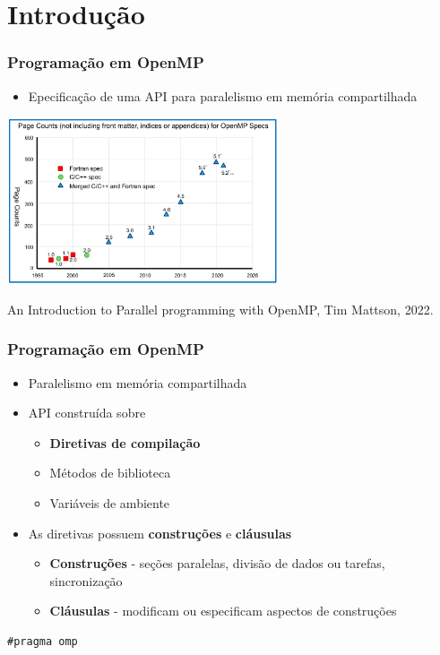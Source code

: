 \documentclass[xcolor={usenames,dvipsnames},12pt,presentation,aspectratio=169]{beamer}
\newcommand{\blue}[1]{{\color{blue}#1}}
\begin{document}
\section{Introdução}
\begin{frame}[fragile]
  \frametitle{Programação em OpenMP}
  \begin{itemize}
  \item Epecificação de uma API para paralelismo em \blue{memória compartilhada}
  \end{itemize}
  \begin{center}
    \includegraphics[width=0.6\textwidth]{timespec.png}
   \end{center}  
  \vspace{-4mm}
  {\tiny An Introduction to Parallel programming with OpenMP, Tim Mattson, 2022.}  
\end{frame}
\begin{frame}[fragile]
  \frametitle{Programação em OpenMP}
  \begin{itemize}
  \item Paralelismo em \blue{memória compartilhada}
  \item API construída sobre
    \begin{itemize}
    \item {\bf Diretivas de compilação}
    \item Métodos de biblioteca
    \item Variáveis de ambiente
    \end{itemize}
  \end{itemize}
  \begin{itemize}
    \item As diretivas possuem {\bf construções} e {\bf cláusulas}
      \begin{itemize}
      \item {\bf Construções} - seções paralelas, divisão de dados ou tarefas, sincronização
      \item {\bf Cláusulas} - modificam ou especificam aspectos de construções
      \end{itemize}
    \end{itemize}  
  \begin{minipage}{0.95\textwidth}  
    \begin{verbatim}
#pragma omp
\end{verbatim}
\end{minipage}

\end{frame}
\end{document}
